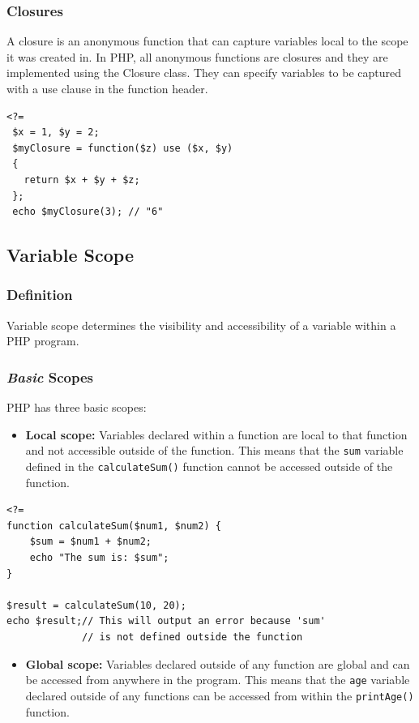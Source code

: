 \documentclass[11pt]{article}
\begin{document}
\subsubsection{Closures}
\label{sec:org877c9ee}
A closure is an anonymous function that can capture variables local to the
scope it was created in. In PHP, all anonymous functions are closures and
they are implemented using the Closure class. They can specify variables
to be captured with a use clause in the function header.
\begin{verbatim}
<?=
 $x = 1, $y = 2;
 $myClosure = function($z) use ($x, $y)
 {
   return $x + $y + $z;
 };
 echo $myClosure(3); // "6"
\end{verbatim}

\subsection{Variable Scope}
\label{sec:orge1662b3}
\subsubsection{Definition}
\label{sec:org110a01b}
Variable scope determines the visibility and accessibility of a variable
within a PHP program.
\subsubsection{\emph{Basic} Scopes}
\label{sec:orgb13e4c9}
PHP has three basic scopes:

\begin{itemize}
\item \textbf{Local scope:} Variables declared within a function are local to that
function and not accessible outside of the function. This means that
the \texttt{sum} variable defined in the \texttt{calculateSum()} function cannot be
accessed outside of the function.
\end{itemize}

\begin{verbatim}
<?=
function calculateSum($num1, $num2) {
    $sum = $num1 + $num2;
    echo "The sum is: $sum";
}

$result = calculateSum(10, 20);
echo $result;// This will output an error because 'sum'
             // is not defined outside the function
\end{verbatim}

\begin{itemize}
\item \textbf{Global scope:} Variables declared outside of any function are global
and can be accessed from anywhere in the program. This means that the
\texttt{age} variable declared outside of any functions can be accessed from
within the \texttt{printAge()} function.
\end{itemize}
\end{document}
